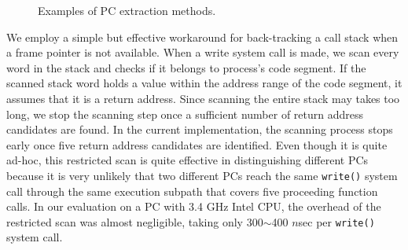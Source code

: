 \begin{figure}[t]
	\centering
	\caption{Examples of PC extraction methods.}
	\label{fig:getpc}
	\vspace{-10pt}
\end{figure}

We employ a simple but effective workaround for back-tracking a call stack when
a frame pointer is not available.  When a write system call is made,
we scan every word in the stack
and checks if it belongs to process's code segment.  If the scanned stack word
holds a value within the address range of the code segment, it assumes that it
is a return address.  Since scanning the entire stack may takes too long, we stop
the scanning step once a sufficient number of return address candidates are found.
In the current implementation, the scanning process stops early once 
five return address candidates are identified.  
Even though it is quite ad-hoc, this restricted scan is quite effective
in distinguishing different PCs because it is very unlikely that two different PCs
reach the same \texttt{write()} system call through the same execution subpath 
that covers five proceeding function calls. 
In our evaluation on a PC with 3.4 GHz Intel CPU, the overhead of the
restricted scan was almost negligible, taking only 300$\sim$400 $n$sec per
\texttt{write()} system call.

